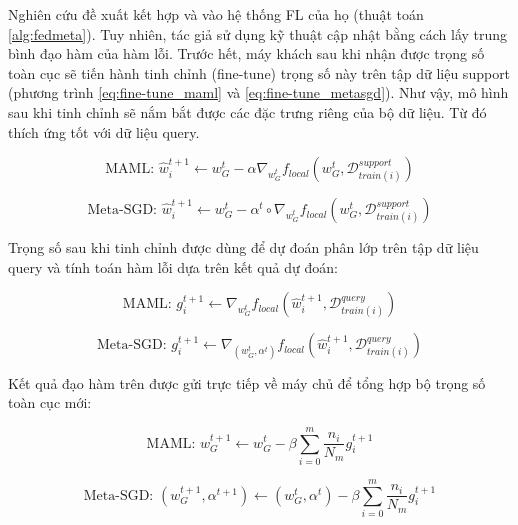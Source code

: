 Nghiên cứu \cite{chen2018federated} đề xuất kết hợp  và  vào hệ thống FL của họ (thuật toán \ref{alg:fedmeta}). Tuy nhiên, tác giả sử dụng kỹ thuật cập nhật bằng cách lấy trung bình đạo hàm của hàm lỗi. Trước hết, máy khách sau khi nhận được trọng số toàn cục sẽ tiến hành tinh chỉnh (fine-tune) trọng số này trên tập dữ liệu support (phương trình \ref{eq:fine-tune_maml} và \ref{eq:fine-tune_metasgd}). Như vậy, mô hình sau khi tinh chỉnh sẽ nắm bắt được các đặc trưng riêng của bộ dữ liệu. Từ đó thích ứng tốt với dữ liệu query.

\begin{dmath}
    \label{eq:fine-tune_maml}
    \text{MAML: } \hat{w}_i^{t+1} \gets w_G^t - \alpha\nabla_{w_G^t} f_{local}(w_G^t, \mathcal{D}_{train(i)}^{support})
\end{dmath}

\begin{dmath}
    \label{eq:fine-tune_metasgd}
    \text{Meta-SGD: } \hat{w}_i^{t+1} \gets w_G^t - \alpha^t \circ \nabla_{w_G^t} f_{local}(w_G^t, \mathcal{D}_{train(i)}^{support})
\end{dmath}

Trọng số sau khi tinh chỉnh được dùng để dự đoán phân lớp trên tập dữ liệu query và tính toán hàm lỗi dựa trên kết quả dự đoán:

\begin{dmath}
    \label{eq:grad_maml}
    \text{MAML: } g_i^{t+1} \gets \nabla_{w_G^t} f_{local}(\hat{w}_i^{t+1}, \mathcal{D}_{train(i)}^{query})
\end{dmath}

\begin{dmath}
    \label{eq:grad_metasgd}
    \text{Meta-SGD: } g_i^{t+1} \gets \nabla_{(w_G^t,\alpha^t)} f_{local}(\hat{w}_i^{t+1}, \mathcal{D}_{train(i)}^{query})
\end{dmath}

Kết quả đạo hàm trên được gửi trực tiếp về máy chủ để tổng hợp bộ trọng số toàn cục mới:

\begin{dmath}
    \label{eq:agg_fedmetamaml}
    \text{MAML: } w_G^{t+1} \gets w_G^t - \beta \sum_{i=0}^m \frac{n_i}{N_m} g_i^{t+1}
\end{dmath}

\begin{dmath}
    \text{Meta-SGD: } (w_G^{t+1}, \alpha^{t+1}) \gets (w_G^t, \alpha^t) - \beta \sum_{i=0}^m \frac{n_i}{N_m} g_i^{t+1}
\end{dmath}

